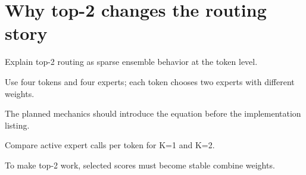 \section{Why top-2 changes the routing story}
\label{sec:ch05-why-top-2-changes-the-routing-story}

Explain top-2 routing as sparse ensemble behavior at the token level.



Use four tokens and four experts; each token chooses two experts with different weights.



The planned mechanics should introduce the equation before the implementation listing.





\begin{checkpointbox}
Compare active expert calls per token for K=1 and K=2.
\end{checkpointbox}

To make top-2 work, selected scores must become stable combine weights.

